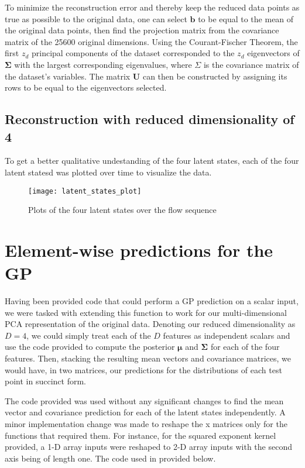 \documentclass{article}
\begin{document}
To minimize the reconstruction error and thereby keep the reduced data points as true as possible to the original data, one can select $\mathbf{b}$ to be equal to the mean of the original data points, then find the projection matrix from the covariance matrix of the 25600 original dimensions. Using the Courant-Fischer Theorem, the first $z_d$ principal components of the dataset corresponded to the $z_d$ eigenvectors of $\mathbf{\Sigma}$ with the largest corresponding eigenvalues, where $\Sigma$ is the covariance matrix of the dataset's variables. The matrix $\mathbf{U}$ can then be constructed by assigning its rows to be equal to the eigenvectors selected.

\subsection{Reconstruction with reduced dimensionality of 4}
To get a better qualitative undestanding of the four latent states, each of the four latent statesd was plotted over time to visualize the data.

\begin{figure}
\begin{center}
\texttt{[image: latent\_states\_plot]}
\caption{Plots of the four latent states over the flow sequence}
\end{center}
\end{figure}

\section{Element-wise predictions for the GP}
Having been provided code that could perform a GP prediction on a scalar input, we were tasked with extending this function to work for our multi-dimensional PCA representation of the original data. Denoting our reduced dimensionality as $D = 4$, we could simply treat each of the $D$ features as independent scalars and use the code provided to compute the posterior $\boldsymbol{\mu}$ and $\mathbf{\Sigma}$ for each of the four features. Then, stacking the resulting mean vectors and covariance matrices, we would have, in two matrices, our predictions for the distributions of each test point in succinct form.

The code provided was used without any significant changes to find the mean vector and covariance prediction for each of the latent states independently. A minor implementation change was made to reshape the x matrices only for the functions that required them. For instance, for the squared exponent kernel provided, a 1-D array inputs were reshaped to 2-D array inputs with the second axis being of length one. The code used in provided below.
\end{document}
